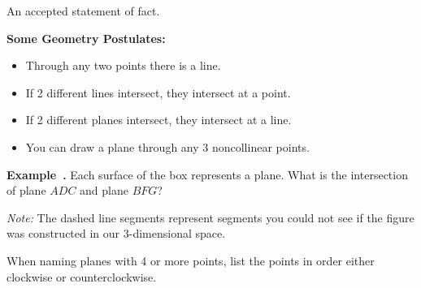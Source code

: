 \documentclass{article}
\newcounter{example}[section]
\newenvironment{example}[1][]{\refstepcounter{example}\par\medskip
   {\color{red}\textbf{Example~\theexample. #1}}}{\medskip}
\begin{document}
\begin{tcolorbox}[
colframe=black!20!white, 
opacitybacktitle=0.1,
coltitle=black, title=\textbf{Postulate (a.k.a. Axiom)}]
An accepted statement of fact.
\end{tcolorbox}
\vspace{0.5in}


\textbf{Some Geometry Postulates:}
\begin{itemize}
    \item Through any two points there is a line.
    \item If 2 different lines intersect, they intersect at a point.
    \item If 2 different planes intersect, they intersect at a line.
    \item You can draw a plane through any 3 noncollinear points.
\end{itemize}

\newpage 

\begin{example}
Each surface of the box represents a plane. What is the intersection of plane $ADC$ and plane $BFG$? \newline 

\emph{Note:} The dashed line segments represent segments you could not see if the figure was constructed in our 3-dimensional space. \bigskip 

\end{example} 
\vspace{0.25in}


When naming planes with 4 or more points, list the points in order either clockwise or counterclockwise.

\vspace{0.25in}
\end{document}
